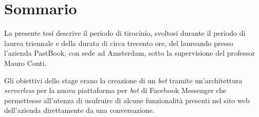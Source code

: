 \cleardoublepage
{}
\section*{Sommario}
\thispagestyle{empty}

La presente tesi descrive il periodo di tirocinio, svoltosi durante il periodo
di laurea triennale e della durata di circa trecento ore, del laureando
\myName{} presso l'azienda PastBook, con sede ad Amsterdam, sotto la
supervisione del professor Mauro Conti.

Gli obiettivi dello stage erano la creazione di un \textit{bot} tramite
un'architettura \textit{serverless} per la nuova piattaforma per \textit{bot} di
Facebook Messenger che permettesse all'utenza di usufruire di alcune
funzionalità presenti nel sito web dell'azienda direttamente da una
conversazione.

\bigskip


